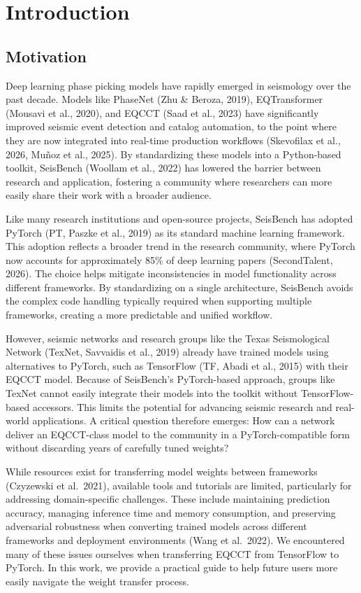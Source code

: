 \section{Introduction}

\subsection{Motivation}

Deep learning phase picking models have rapidly emerged in seismology over the past decade. Models like PhaseNet (Zhu \& Beroza, 2019), EQTransformer (Mousavi et al., 2020), and EQCCT (Saad et al., 2023) have significantly improved seismic event detection and catalog automation, to the point where they are now integrated into real-time production workflows (Skevofilax et al., 2026, Muñoz et al., 2025). By standardizing these models into a Python-based toolkit, SeisBench (Woollam et al., 2022) has lowered the barrier between research and application, fostering a community where researchers can more easily share their work with a broader audience.

Like many research institutions and open-source projects, SeisBench has adopted PyTorch (PT, Paszke et al., 2019) as its standard machine learning framework. This adoption reflects a broader trend in the research community, where PyTorch now accounts for approximately 85\% of deep learning papers (SecondTalent, 2026). The choice helps mitigate inconsistencies in model functionality across different frameworks. By standardizing on a single architecture, SeisBench avoids the complex code handling typically required when supporting multiple frameworks, creating a more predictable and unified workflow.

However, seismic networks and research groups like the Texas Seismological Network (TexNet, Savvaidis et al., 2019) already have trained models using alternatives to PyTorch, such as TensorFlow (TF, Abadi et al., 2015) with their EQCCT model. Because of SeisBench's PyTorch-based approach, groups like TexNet cannot easily integrate their models into the toolkit without TensorFlow-based accessors. This limits the potential for advancing seismic research and real-world applications. A critical question therefore emerges: How can a network deliver an EQCCT-class model to the community in a PyTorch-compatible form without discarding years of carefully tuned weights?

While resources exist for transferring model weights between frameworks (Czyzewski et al.\ 2021), available tools and tutorials are limited, particularly for addressing domain-specific challenges. These include maintaining prediction accuracy, managing inference time and memory consumption, and preserving adversarial robustness when converting trained models across different frameworks and deployment environments (Wang et al.\ 2022). We encountered many of these issues ourselves when transferring EQCCT from TensorFlow to PyTorch. In this work, we provide a practical guide to help future users more easily navigate the weight transfer process.

